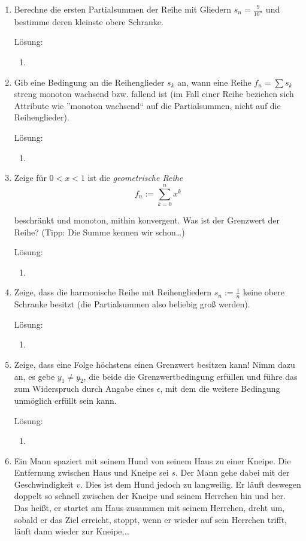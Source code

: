 \documentclass[main.tex]{subfiles}
\begin{document}
\begin{enumerate}
	\item Berechne die ersten Partialsummen der Reihe mit Gliedern \( s_n = \frac{9}{10^n} \) und
          bestimme deren kleinste obere Schranke. 
          
          Lösung:
          \begin{enumerate}
              \item 
          \end{enumerate}
	\item Gib eine Bedingung an die Reihenglieder \( s_k \) an, wann eine Reihe \( f_n = \sum s_k \)
	      streng monoton wachsend bzw. fallend ist (im Fall einer Reihe beziehen sich
	      Attribute wie ”monoton wachsend“ auf die Partialsummen, nicht auf die
	      Reihenglieder).
          
          Lösung:
          \begin{enumerate}
              \item 
          \end{enumerate}
	\item Zeige für \( 0 < x < 1  \) ist die \textit{geometrische Reihe}
	      \[ f_n := \sum_{k = 0}^{n} x^k \]

	      beschränkt und monoton, mithin konvergent. Was ist der Grenzwert der Reihe?
	      (Tipp: Die Summe kennen wir schon\dots )
          
          Lösung:
          \begin{enumerate}
              \item 
          \end{enumerate}
	\item Zeige, dass die harmonische Reihe mit Reihengliedern \( s_n := \frac{1}{n} \) keine obere
	      Schranke besitzt (die Partialsummen also beliebig groß werden).
          
          Lösung:
          \begin{enumerate}
              \item 
          \end{enumerate}
	\item Zeige, dass eine Folge höchstens einen Grenzwert besitzen kann!
	      Nimm dazu an, es gebe \( y_1 \neq y_2 \), die beide die Grenzwertbedingung erfüllen und
	      führe das zum Widerspruch durch Angabe eines \( \epsilon \), mit dem die weitere Bedingung
	      unmöglich erfüllt sein kann.
          
          Lösung:
          \begin{enumerate}
              \item 
          \end{enumerate}
	\item Ein Mann spaziert mit seinem Hund von seinem Haus zu einer Kneipe. Die
	      Entfernung zwischen Haus und Kneipe sei \( s \). Der Mann gehe dabei mit der
	      Geschwindigkeit \( v \). Dies ist dem Hund jedoch zu langweilig. Er läuft deswegen
	      doppelt so schnell zwischen der Kneipe und seinem Herrchen hin und her.
	      Das heißt, er startet am Haus zusammen mit seinem Herrchen, dreht um,
	      sobald er das Ziel erreicht, stoppt, wenn er wieder auf sein Herrchen trifft,
	      läuft dann wieder zur Kneipe,\dots


\end{enumerate}
\end{document}
